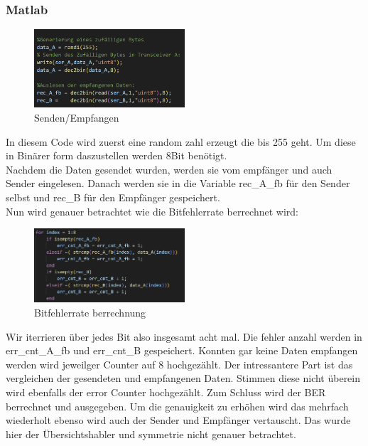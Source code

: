 \subsubsection{Matlab}
\begin{figure}[H]
    \centering
    \includegraphics[width=0.5\textwidth]{Pictures/einlesenMatlab.png}
    \caption{Senden/Empfangen}
    \label{fig:matlab_example}
\end{figure}
In diesem Code wird zuerst eine random zahl erzeugt die bis 255 geht.
Um diese in Binärer form daszustellen werden 8Bit benötigt.
\\
Nachdem die Daten gesendet wurden, werden sie vom empfänger und auch Sender eingelesen.
Danach werden sie in die Variable rec\_A\_fb für den Sender selbst und rec\_B für den Empfänger gespeichert.
\\
Nun wird genauer betrachtet wie die Bitfehlerrate berrechnet wird:
\begin{figure}[H]
    \centering
    \includegraphics[width=0.5\textwidth]{Pictures/vergleich.png}
    \caption{Bitfehlerrate berrechnung}
    \label{fig:bitfehler}
\end{figure}
Wir iterrieren über jedes Bit also insgesamt acht mal.
Die fehler anzahl werden in err\_cnt\_A\_fb und err\_cnt\_B gespeichert.
Konnten gar keine Daten empfangen werden wird jeweilger Counter auf 8 hochgezählt.
Der intressantere Part ist das vergleichen der gesendeten und empfangenen Daten.
Stimmen diese nicht überein wird ebenfalls der error Counter hochgezählt.
Zum Schluss wird der BER berrechnet und ausgegeben.
Um die genauigkeit zu erhöhen wird das mehrfach wiederholt ebenso wird auch der Sender und Empfänger vertauscht.
Das wurde hier der Übersichtshabler und symmetrie nicht genauer betrachtet.




